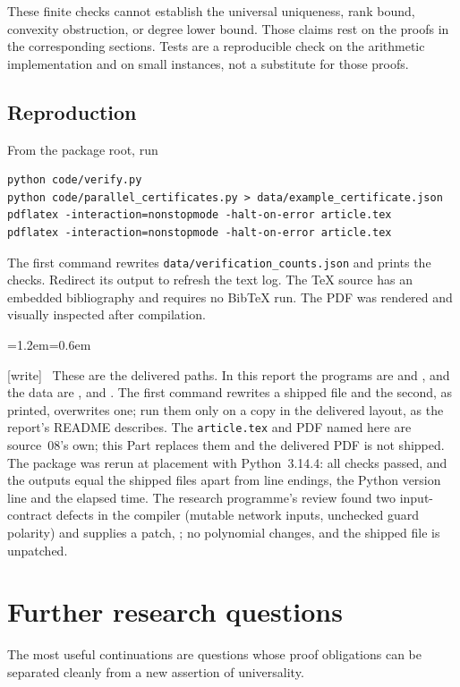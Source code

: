 \documentclass[11pt,letterpaper]{article}
\theoremstyle{definition}
\theoremstyle{remark}
\newcommand{\wtag}{\textup{[write]}}
\newenvironment{writenote}{\par\smallskip\begin{list}{}{\leftmargin=1.2em\rightmargin=0.6em}\item[]\small\wtag\ }{\end{list}\smallskip}
\begin{document}
These finite checks cannot establish the universal uniqueness, rank
bound, convexity obstruction, or degree lower bound. Those claims rest
on the proofs in the corresponding sections. Tests are a reproducible
check on the arithmetic implementation and on small instances, not a
substitute for those proofs.

\subsection{Reproduction}
From the package root, run
\begin{verbatim}
python code/verify.py
python code/parallel_certificates.py > data/example_certificate.json
pdflatex -interaction=nonstopmode -halt-on-error article.tex
pdflatex -interaction=nonstopmode -halt-on-error article.tex
\end{verbatim}
The first command rewrites \texttt{data/verification\_counts.json} and
prints the checks. Redirect its output to refresh the text log. The TeX
source has an embedded bibliography and requires no BibTeX run. The PDF
was rendered and visually inspected after compilation.

\begin{writenote}
These are the delivered paths. In this report the programs are  and , and the data are ,  and . The first command rewrites a shipped file and the second, as printed, overwrites one; run them only on a copy in the delivered layout, as the report's README describes. The \texttt{article.tex} and PDF named here are source~08's own; this Part replaces them and the delivered PDF is not shipped. The package was rerun at placement with Python~3.14.4: all checks passed, and the outputs equal the shipped files apart from line endings, the Python version line and the elapsed time. The research programme's review found two input-contract defects in the compiler (mutable network inputs, unchecked guard polarity) and supplies a patch, ; no polynomial changes, and the shipped file is unpatched.
\end{writenote}

\section{Further research questions}\label{qoc:mp:sec:future}
The most useful continuations are questions whose proof obligations can
be separated cleanly from a new assertion of universality.
\end{document}
